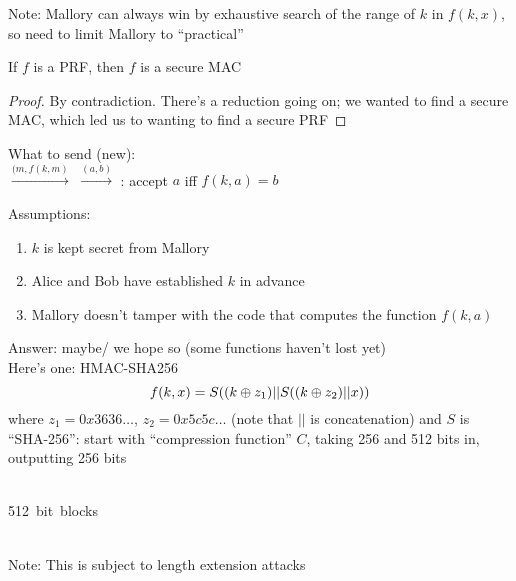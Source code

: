 \begin{itemize}
{    Note: Mallory can always win by exhaustive search of the range of $k$ in $f(k, x)$, so need to
    limit Mallory to ``practical''\\

    \begin{theorem*}{If $f$ is a PRF, then $f$ is a secure MAC}\end{theorem*}
    \begin{proof} By contradiction. There's a reduction going on; we wanted
    to find a secure MAC, which led us to wanting to find a secure PRF
    \end{proof}
}
\end{itemize}

What to send (new):\\

 $\xrightarrow{(m, f(k, m)}$
     $\xrightarrow{(a,b)}$
     : accept $a$ iff $f(k, a) = b$

Assumptions:
\begin{enumerate}
    \item $k$ is kept secret from Mallory
    \item Alice and Bob have established $k$ in advance
    \item Mallory doesn't tamper with the code that computes the function $f(k, a)$
\end{enumerate}

Answer: maybe/ we hope so (some functions haven't lost yet)\\

Here's one: HMAC-SHA256
$$f(k, x) = S((k \oplus z_1) || S((k \oplus z_2) || x))$$
where $z_1 = 0x3636\dots$, $z_2 = 0x5c5c\dots$ (note that $||$ is concatenation)
and $S$ is ``SHA-256'': start with ``compression function'' $C$, taking 256 and
512 bits in, outputting 256 bits

\makebox[2cm]{}\\
\makebox[2cm]{}\framebox[2cm]{}\framebox[2cm]{}\framebox[2cm]{}\framebox[2cm]{}
\mbox{512 bit blocks}\\
\makebox[2cm]{}\makebox[2cm]{$\Downarrow$}\makebox[2cm]{$\Downarrow$}
\makebox[2cm]{$\Downarrow$}\makebox[2cm]{$\Downarrow$}\\
\makebox[.2cm]{$\rightarrow$}
\makebox[4.4cm]{$\cdots$}

Note: This is subject to length extension attacks\\

